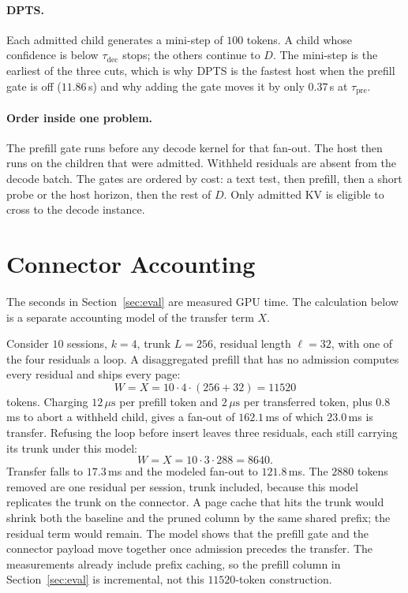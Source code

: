 \paragraph{DPTS.}
Each admitted child generates a mini-step of $100$ tokens.
A child whose confidence is below $\tau_{\mathrm{dec}}$ stops; the others continue to $D$.
The mini-step is the earliest of the three cuts, which is why DPTS is the fastest host when the prefill gate is off ($11.86$\,s) and why adding the gate moves it by only $0.37$\,s at $\tau_{\mathrm{pre}}$.

\paragraph{Order inside one problem.}
The prefill gate runs before any decode kernel for that fan-out.
The host then runs on the children that were admitted.
Withheld residuals are absent from the decode batch.
The gates are ordered by cost: a text test, then prefill, then a short probe or the host horizon, then the rest of $D$.
Only admitted KV is eligible to cross to the decode instance.

\section{Connector Accounting}
\label{app:xfer}

The seconds in Section~\ref{sec:eval} are measured GPU time.
The calculation below is a separate accounting model of the transfer term $X$.

Consider $10$ sessions, $k{=}4$, trunk $L{=}256$, residual length $\ell{=}32$, with one of the four residuals a loop.
A disaggregated prefill that has no admission computes every residual and ships every page:
\[
W = X = 10 \cdot 4 \cdot (256+32) = 11520
\]
tokens.
Charging $12\,\mu\mathrm{s}$ per prefill token and $2\,\mu\mathrm{s}$ per transferred token, plus $0.8$\,ms to abort a withheld child, gives a fan-out of $162.1$\,ms of which $23.0$\,ms is transfer.
Refusing the loop before insert leaves three residuals, each still carrying its trunk under this model:
\[
W = X = 10 \cdot 3 \cdot 288 = 8640.
\]
Transfer falls to $17.3$\,ms and the modeled fan-out to $121.8$\,ms.
The $2880$ tokens removed are one residual per session, trunk included, because this model replicates the trunk on the connector.
A page cache that hits the trunk would shrink both the baseline and the pruned column by the same shared prefix; the residual term would remain.
The model shows that the prefill gate and the connector payload move together once admission precedes the transfer.
The measurements already include prefix caching, so the prefill column in Section~\ref{sec:eval} is incremental, not this $11520$-token construction.

